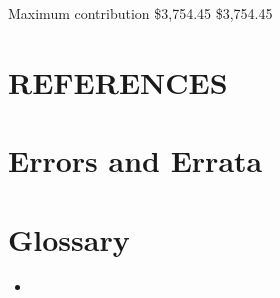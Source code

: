 \documentclass[letterpaper,10pt,english]{sphinxmanual}
\begin{document}
\sphinxAtStartPar
Maximum contribution \$3,754.45 \$3,754.45

\sphinxstepscope


\chapter{REFERENCES}
\label{\detokenize{references:references}}\label{\detokenize{references::doc}}
\sphinxstepscope


\chapter{Errors and Errata}
\label{\detokenize{errata:errors-and-errata}}\label{\detokenize{errata::doc}}

\chapter{Glossary}
\label{\detokenize{index:glossary}}\begin{itemize}
\item {} 
\sphinxAtStartPar
{}

\end{itemize}



\renewcommand{\indexname}{Index}
\printindex
\end{document}
